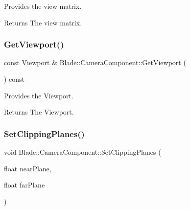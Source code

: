 Provides the view matrix. 

\begin{DoxyReturn}{Returns}
The view matrix. 
\end{DoxyReturn}
\mbox{\label{class_blade_1_1_camera_component_a3ddce5974c61927eb3bb06f2381d780e}} 
\subsubsection{\texorpdfstring{Get\+Viewport()}{GetViewport()}}
{\footnotesize\ttfamily const Viewport \& Blade\+::\+Camera\+Component\+::\+Get\+Viewport (\begin{DoxyParamCaption}{ }\end{DoxyParamCaption}) const\hspace{0.3cm}{\ttfamily [noexcept]}}



Provides the Viewport. 

\begin{DoxyReturn}{Returns}
The Viewport. 
\end{DoxyReturn}
\mbox{\label{class_blade_1_1_camera_component_aee047bbc83b264db1cea4ebd6445495b}} 
\subsubsection{\texorpdfstring{Set\+Clipping\+Planes()}{SetClippingPlanes()}\hspace{0.1cm}{\footnotesize\ttfamily [1/2]}}
{\footnotesize\ttfamily void Blade\+::\+Camera\+Component\+::\+Set\+Clipping\+Planes (\begin{DoxyParamCaption}\item[{float}]{near\+Plane,  }\item[{float}]{far\+Plane }\end{DoxyParamCaption})\hspace{0.3cm}{\ttfamily [noexcept]}}



